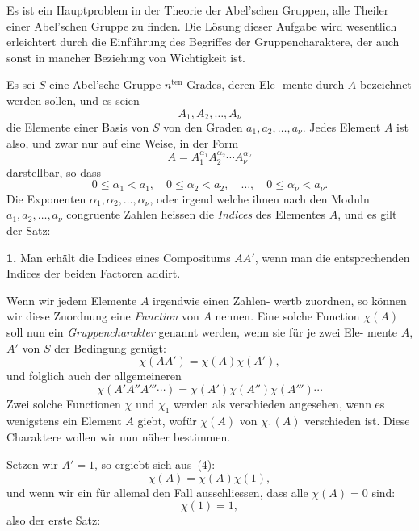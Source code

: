 \documentclass[12pt,a4paper]{article}
\theoremstyle{plain}
\theoremstyle{definition}
\theoremstyle{remark}
\begin{document}
Es ist ein Hauptproblem in der Theorie der Abel'schen
Gruppen, alle Theiler einer Abel'schen Gruppe zu finden. Die
Lösung dieser Aufgabe wird wesentlich erleichtert durch die
Einführung des Begriffes der Gruppencharaktere, der auch sonst
in mancher Beziehung von Wichtigkeit ist.

Es sei $S$ eine Abel'sche Gruppe $n^{\text{ten}}$ Grades, deren Ele-
mente durch $A$ bezeichnet werden sollen, und es seien
\begin{equation}\tag{1}
A_1, A_2, \ldots, A_\nu
\end{equation}
die Elemente einer Basis von $S$ von den Graden $a_1, a_2, \ldots, a_\nu$.
Jedes Element $A$ ist also, und zwar nur auf eine Weise, in
der Form
\begin{equation}\tag{2}
A = A_1^{\alpha_1} A_2^{\alpha_2} \cdots A_\nu^{\alpha_\nu}
\end{equation}
darstellbar, so dass
\begin{equation}\tag{3}
0 \leq \alpha_1 < a_1, \quad 0 \leq \alpha_2 < a_2, \quad \ldots, \quad 0 \leq \alpha_\nu < a_\nu.
\end{equation}
Die Exponenten $\alpha_1, \alpha_2, \ldots, \alpha_\nu$, oder irgend welche ihnen nach
den Moduln $a_1, a_2, \ldots, a_\nu$ congruente Zahlen heissen die \emph{Indices}
des Elementes $A$, und es gilt der Satz:

\textbf{1.} Man erhält die Indices eines Compositums $AA'$,
wenn man die entsprechenden Indices der beiden
Factoren addirt.

Wenn wir jedem Elemente $A$ irgendwie einen Zahlen-
wertb zuordnen, so können wir diese Zuordnung eine \emph{Function}
von $A$ nennen. Eine solche Function $\chi(A)$ soll nun ein
\emph{Gruppencharakter} genannt werden, wenn sie für je zwei Ele-
mente $A$, $A'$ von $S$ der Bedingung genügt:
\begin{equation}\tag{4}
\chi(AA') = \chi(A) \chi(A'),
\end{equation}
und folglich auch der allgemeineren
\[
\chi(A' A'' A''' \cdots) = \chi(A') \chi(A'') \chi(A''') \cdots
\]
Zwei solche Functionen $\chi$ und $\chi_1$ werden als verschieden
angesehen, wenn es wenigstens ein Element $A$ giebt, wofür $\chi(A)$
von $\chi_1(A)$ verschieden ist. Diese Charaktere wollen wir nun
näher bestimmen.

Setzen wir $A' = 1$, so ergiebt sich aus~(4):
\begin{equation}\tag{5}
\chi(A) = \chi(A) \chi(1),
\end{equation}
und wenn wir ein für allemal den Fall ausschliessen, dass alle
$\chi(A) = 0$ sind:
\begin{equation}\tag{6}
\chi(1) = 1,
\end{equation}
also der erste Satz:
\end{document}
